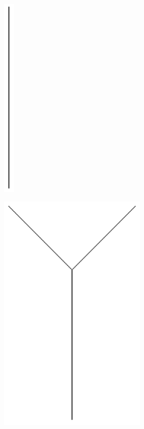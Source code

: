 \begin{minipage}[b]{0.25\textwidth}
  \centering
  \includegraphics[width=0.04\textwidth]{./inf/SEKII/06_Java_Rekursion/Aufgabe2_1-1.png}
\end{minipage}\hfill                  
\begin{minipage}[b]{0.3\textwidth}
  \centering
  \includegraphics[width=0.55\textwidth]{./inf/SEKII/06_Java_Rekursion/Aufgabe2_1-2.png}
\end{minipage}\hfill
